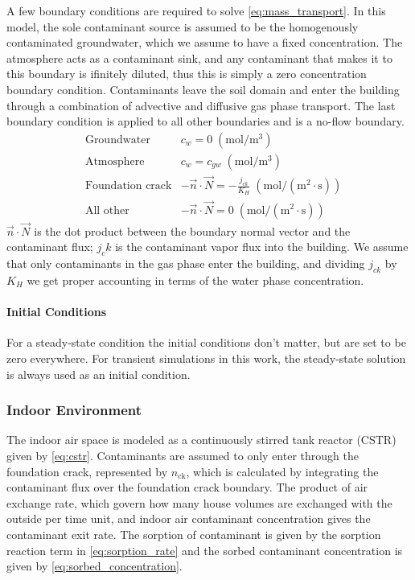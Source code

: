 A few boundary conditions are required to solve \eqref{eq:mass_transport}.
In this model, the sole contaminant source is assumed to be the homogenously contaminated groundwater, which we assume to have a fixed concentration.
The atmosphere acts as a contaminant sink, and any contaminant that makes it to this boundary is ifinitely diluted, thus this is simply a zero concentration boundary condition.
Contaminants leave the soil domain and enter the building through a combination of advective and diffusive gas phase transport.
The last boundary condition is applied to all other boundaries and is a no-flow boundary.
\begin{align}
  &\text{Groundwater} & c_w = 0 \; \mathrm{(mol/m^3)} \\
  &\text{Atmosphere} & c_w = c_{gw} \; \mathrm{(mol/m^3)} \\
  &\text{Foundation crack} & -\vec{n} \cdot \vec{N} = - \frac{j_{ck}}{K_H} \; \mathrm{(mol/(m^2 \cdot s))}\\
  &\text{All other} & -\vec{n} \cdot \vec{N} = 0 \; \mathrm{(mol/(m^2 \cdot s))}
\end{align}
$\vec{n} \cdot \vec{N}$ is the dot product between the boundary normal vector and the contaminant flux;
$j_ck$ is the contaminant vapor flux into the building.
We assume that only contaminants in the gas phase enter the building, and dividing $j_{ck}$ by $K_H$ we get proper accounting in terms of the water phase concentration.\par

\paragraph{Initial Conditions}

For a steady-state condition the initial conditions don't matter, but are set to be zero everywhere.
For transient simulations in this work, the steady-state solution is always used as an initial condition.

\subsubsection{Indoor Environment}\label{sec:indoor_environment}

The indoor air space is modeled as a continuously stirred tank reactor (CSTR) given by \eqref{eq:cstr}.
Contaminants are assumed to only enter through the foundation crack, represented by $n_\mathrm{ck}$, which is calculated by integrating the contaminant flux over the foundation crack boundary.
The product of air exchange rate, which govern how many house volumes are exchanged with the outside per time unit, and indoor air contaminant concentration gives the contaminant exit rate.
The sorption of contaminant is given by the sorption reaction term in \eqref{eq:sorption_rate} and the sorbed contaminant concentration is given by \eqref{eq:sorbed_concentration}.

